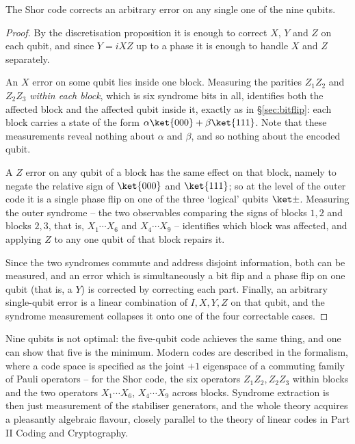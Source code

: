 \begin{theorem}
	The Shor code corrects an arbitrary error on any single one of the nine qubits.
\end{theorem}

\begin{proof}
	By the discretisation proposition it is enough to correct $X$, $Y$ and $Z$ on each qubit, and since $Y = iXZ$ up to a phase it is enough to handle $X$ and $Z$ separately.

	An $X$ error on some qubit lies inside one block. Measuring the parities $Z_1Z_2$ and $Z_2Z_3$ \emph{within each block}, which is six syndrome bits in all, identifies both the affected block and the affected qubit inside it, exactly as in \S\ref{sec:bitflip}: each block carries a state of the form $\alpha\ket{000}+\beta\ket{111}$. Note that these measurements reveal nothing about $\alpha$ and $\beta$, and so nothing about the encoded qubit.

	A $Z$ error on any qubit of a block has the same effect on that block, namely to negate the relative sign of $\ket{000}$ and $\ket{111}$; so at the level of the outer code it is a single phase flip on one of the three `logical' qubits $\ket\pm$. Measuring the outer syndrome -- the two observables comparing the signs of blocks $1,2$ and blocks $2,3$, that is, $X_1\cdots X_6$ and $X_4\cdots X_9$ -- identifies which block was affected, and applying $Z$ to any one qubit of that block repairs it.

	Since the two syndromes commute and address disjoint information, both can be measured, and an error which is simultaneously a bit flip and a phase flip on one qubit (that is, a $Y$) is corrected by correcting each part. Finally, an arbitrary single-qubit error is a linear combination of $I,X,Y,Z$ on that qubit, and the syndrome measurement collapses it onto one of the four correctable cases.
\end{proof}

\begin{remark}
	Nine qubits is not optimal: the five-qubit code achieves the same thing, and one can show that five is the minimum. Modern codes are described in the  formalism, where a code space is specified as the joint $+1$ eigenspace of a commuting family of Pauli operators -- for the Shor code, the six operators $Z_1Z_2, Z_2Z_3$ within blocks and the two operators $X_1\cdots X_6$, $X_4\cdots X_9$ across blocks. Syndrome extraction is then just measurement of the stabiliser generators, and the whole theory acquires a pleasantly algebraic flavour, closely parallel to the theory of linear codes in Part II Coding and Cryptography.
\end{remark}

